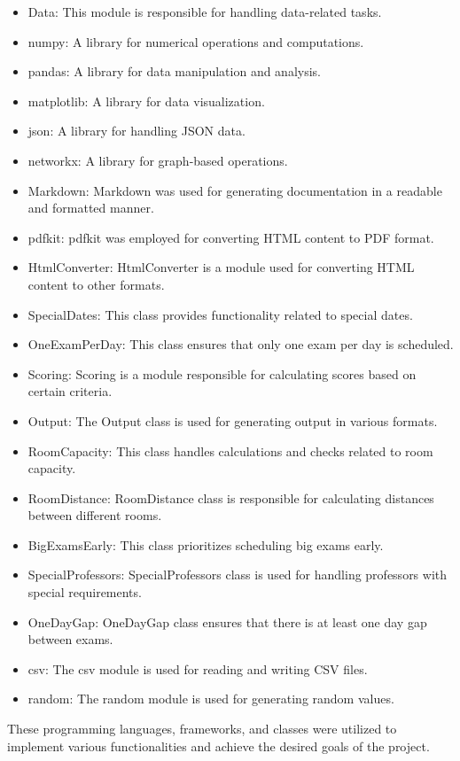 \begin{itemize}
\item Data: This module is responsible for handling data-related tasks.
\item numpy: A library for numerical operations and computations.
\item pandas: A library for data manipulation and analysis.
\item matplotlib: A library for data visualization.
\item json: A library for handling JSON data.
\item networkx: A library for graph-based operations.
\item Markdown: Markdown was used for generating documentation in a readable and formatted manner.
\item pdfkit: pdfkit was employed for converting HTML content to PDF format.
\item HtmlConverter: HtmlConverter is a module used for converting HTML content to other formats.
\item SpecialDates: This class provides functionality related to special dates.
\item OneExamPerDay: This class ensures that only one exam per day is scheduled.
\item Scoring: Scoring is a module responsible for calculating scores based on certain criteria.
\item Output: The Output class is used for generating output in various formats.
\item RoomCapacity: This class handles calculations and checks related to room capacity.
\item RoomDistance: RoomDistance class is responsible for calculating distances between different rooms.
\item BigExamsEarly: This class prioritizes scheduling big exams early.
\item SpecialProfessors: SpecialProfessors class is used for handling professors with special requirements.
\item OneDayGap: OneDayGap class ensures that there is at least one day gap between exams.
\item csv: The csv module is used for reading and writing CSV files.
\item random: The random module is used for generating random values.
\end{itemize}

These programming languages, frameworks, and classes were utilized to implement various functionalities and achieve the desired goals of the project.
